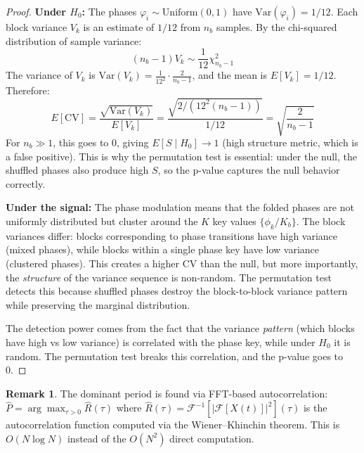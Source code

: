 \documentclass[11pt]{article}
\theoremstyle{definition}
\newtheorem{remark}[theorem]{Remark}
\begin{document}
\begin{proof}
\textbf{Under $H_0$:} The phases $\varphi_i \sim \mathrm{Uniform}(0,1)$ have $\mathrm{Var}(\varphi_i) = 1/12$. Each block variance $V_k$ is an estimate of $1/12$ from $n_b$ samples. By the chi-squared distribution of sample variance:
\begin{equation}
(n_b - 1) V_k \sim \frac{1}{12} \chi^2_{n_b - 1}
\end{equation}
The variance of $V_k$ is $\mathrm{Var}(V_k) = \frac{1}{12^2} \cdot \frac{2}{n_b - 1}$, and the mean is $E[V_k] = 1/12$. Therefore:
\begin{equation}
E[\mathrm{CV}] = \frac{\sqrt{\mathrm{Var}(V_k)}}{E[V_k]} = \frac{\sqrt{2/(12^2(n_b-1))}}{1/12} = \sqrt{\frac{2}{n_b - 1}}
\end{equation}
For $n_b \gg 1$, this goes to 0, giving $E[S \mid H_0] \to 1$ (high structure metric, which is a false positive). This is why the permutation test is essential: under the null, the shuffled phases also produce high $S$, so the p-value captures the null behavior correctly.

\textbf{Under the signal:} The phase modulation means that the folded phases are not uniformly distributed but cluster around the $K$ key values $\{\phi_k/K_b\}$. The block variances differ: blocks corresponding to phase transitions have high variance (mixed phases), while blocks within a single phase key have low variance (clustered phases). This creates a higher CV than the null, but more importantly, the \emph{structure} of the variance sequence is non-random. The permutation test detects this because shuffled phases destroy the block-to-block variance pattern while preserving the marginal distribution.

The detection power comes from the fact that the variance \emph{pattern} (which blocks have high vs low variance) is correlated with the phase key, while under $H_0$ it is random. The permutation test breaks this correlation, and the p-value goes to 0.
\end{proof}

\begin{remark}
The dominant period is found via FFT-based autocorrelation: $\hat{P} = \arg\max_{\tau > 0} \hat{R}(\tau)$ where $\hat{R}(\tau) = \mathcal{F}^{-1}[|\mathcal{F}[X(t)]|^2](\tau)$ is the autocorrelation function computed via the Wiener--Khinchin theorem. This is $O(N \log N)$ instead of the $O(N^2)$ direct computation.
\end{remark}


\end{document}
